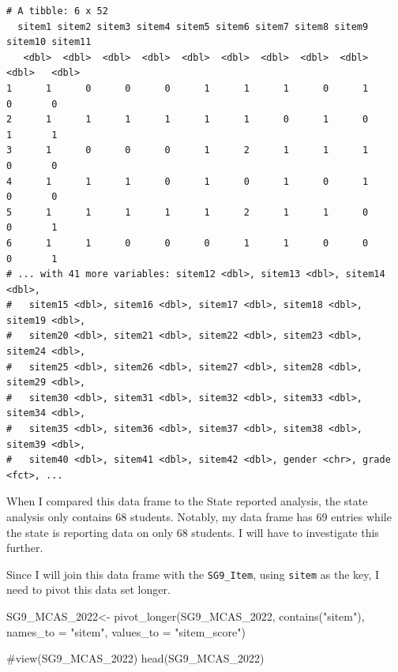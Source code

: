 \documentclass[
  letterpaper,
  DIV=11,
  numbers=noendperiod]{scrartcl}
\newenvironment{Shaded}{\begin{snugshade}}{\end{snugshade}}
\newcommand{\AttributeTok}[1]{\textcolor[rgb]{0.40,0.45,0.13}{#1}}
\newcommand{\CommentTok}[1]{\textcolor[rgb]{0.37,0.37,0.37}{#1}}
\newcommand{\FunctionTok}[1]{\textcolor[rgb]{0.28,0.35,0.67}{#1}}
\newcommand{\NormalTok}[1]{\textcolor[rgb]{0.00,0.23,0.31}{#1}}
\newcommand{\OtherTok}[1]{\textcolor[rgb]{0.00,0.23,0.31}{#1}}
\newcommand{\StringTok}[1]{\textcolor[rgb]{0.13,0.47,0.30}{#1}}
\begin{document}
\begin{verbatim}
# A tibble: 6 x 52
  sitem1 sitem2 sitem3 sitem4 sitem5 sitem6 sitem7 sitem8 sitem9 sitem10 sitem11
   <dbl>  <dbl>  <dbl>  <dbl>  <dbl>  <dbl>  <dbl>  <dbl>  <dbl>   <dbl>   <dbl>
1      1      0      0      0      1      1      1      0      1       0       0
2      1      1      1      1      1      1      0      1      0       1       1
3      1      0      0      0      1      2      1      1      1       0       0
4      1      1      1      0      1      0      1      0      1       0       0
5      1      1      1      1      1      2      1      1      0       0       1
6      1      1      0      0      0      1      1      0      0       0       1
# ... with 41 more variables: sitem12 <dbl>, sitem13 <dbl>, sitem14 <dbl>,
#   sitem15 <dbl>, sitem16 <dbl>, sitem17 <dbl>, sitem18 <dbl>, sitem19 <dbl>,
#   sitem20 <dbl>, sitem21 <dbl>, sitem22 <dbl>, sitem23 <dbl>, sitem24 <dbl>,
#   sitem25 <dbl>, sitem26 <dbl>, sitem27 <dbl>, sitem28 <dbl>, sitem29 <dbl>,
#   sitem30 <dbl>, sitem31 <dbl>, sitem32 <dbl>, sitem33 <dbl>, sitem34 <dbl>,
#   sitem35 <dbl>, sitem36 <dbl>, sitem37 <dbl>, sitem38 <dbl>, sitem39 <dbl>,
#   sitem40 <dbl>, sitem41 <dbl>, sitem42 <dbl>, gender <chr>, grade <fct>, ...
\end{verbatim}

When I compared this data frame to the State reported analysis, the
state analysis only contains 68 students. Notably, my data frame has 69
entries while the state is reporting data on only 68 students. I will
have to investigate this further.

Since I will join this data frame with the \texttt{SG9\_Item}, using
\texttt{sitem} as the key, I need to pivot this data set longer.

\begin{Shaded}
\begin{Highlighting}[]
\NormalTok{SG9\_MCAS\_2022}\OtherTok{\textless{}{-}} \FunctionTok{pivot\_longer}\NormalTok{(SG9\_MCAS\_2022, }\FunctionTok{contains}\NormalTok{(}\StringTok{"sitem"}\NormalTok{), }\AttributeTok{names\_to =} \StringTok{"sitem"}\NormalTok{, }\AttributeTok{values\_to =} \StringTok{"sitem\_score"}\NormalTok{)}

\CommentTok{\#view(SG9\_MCAS\_2022)}
\FunctionTok{head}\NormalTok{(SG9\_MCAS\_2022)}
\end{Highlighting}
\end{Shaded}
\end{document}
